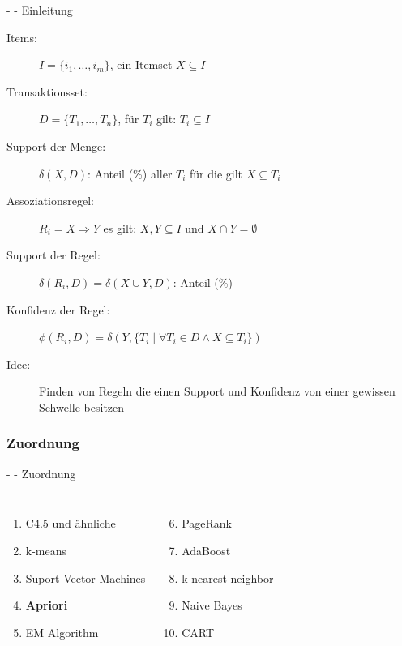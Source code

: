 \documentclass[fleqn,11pt,aspectratio=43]{beamer}
\begin{document}
\begin{frame}[fragile]{\insertsectionhead - \insertsubsectionhead - Einleitung \cite{ester2000knowledge}}
\begin{description}
\item[Items:] $I = \{i_1, \ldots, i_m\}$, ein Itemset $X \subseteq I$
\item[Transaktionsset:] $D = \{T_1, \ldots, T_n\}$, für $T_i$ gilt: $T_i \subseteq I$
\item[Support der Menge:] $\delta(X,D)$: Anteil (\%) aller $T_i$ für die gilt $X \subseteq T_i$
\item[Assoziationsregel:] $R_i = X \Rightarrow Y$ es gilt: $X, Y \subseteq I$ und $X \cap Y = \emptyset$ 
\item[Support der Regel:] $\delta(R_i, D) = \delta(X \cup Y, D)$: Anteil (\%)
\item[Konfidenz der Regel:] $\phi(R_i, D) = \delta(Y, \{T_i\;|\;\forall T_i \in D \wedge X \subseteq T_i\})$
\item[Idee:] Finden von Regeln die einen Support und Konfidenz von einer gewissen Schwelle besitzen
\end{description}
\end{frame}
	
\subsubsection{Zuordnung}

\begin{frame}{\insertsectionhead - \insertsubsectionhead - Zuordnung}
\begin{columns}[onlytextwidth]
		\begin{enumerate}[label=\bfseries\arabic*.]
		\item C4.5 und ähnliche %
		\item k-means %
		\item Suport Vector Machines %
		\item \textbf{Apriori} %
		\item EM Algorithm %
		\end{enumerate}
	    \begin{enumerate}[label=\bfseries\arabic*.]
	    \setcounter{enumi}{5}
	    \item PageRank
	    \item AdaBoost %
	    \item k-nearest neighbor %
	    \item Naive Bayes %
	    \item CART %
	    \end{enumerate}
\end{columns}
\end{frame}
	
\end{document}
